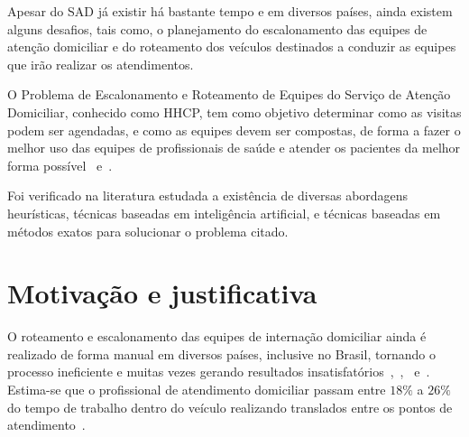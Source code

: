 Apesar do \ac{SAD} já existir há bastante tempo e em diversos países, ainda existem alguns desafios, tais como, o planejamento do escalonamento das equipes de atenção domiciliar e do roteamento dos veículos destinados a conduzir as equipes que irão realizar os atendimentos.

O Problema de Escalonamento e Roteamento de Equipes do Serviço de Atenção Domiciliar, conhecido como \ac{HHCP}, tem como objetivo determinar como as visitas podem ser agendadas, e como as equipes devem ser compostas, de forma a fazer o melhor uso das equipes de profissionais de saúde e atender os pacientes da melhor forma possível~\cite{Bertels:2006} e~\cite{Decerle:2016}.



Foi verificado na literatura estudada a existência de diversas abordagens heurísticas, técnicas baseadas em inteligência artificial, e técnicas baseadas em métodos exatos para solucionar o problema citado.

\section{Motivação e justificativa}

O roteamento e escalonamento das equipes de internação domiciliar ainda é realizado de forma manual em diversos países, inclusive no Brasil, tornando o processo ineficiente e muitas vezes gerando resultados insatisfatórios~\cite{cheng:98},~\cite{bachouch:2010},~\cite{tozlu:2016} e~\cite{cattafi:2012}.
Estima-se que o profissional de atendimento domiciliar passam entre $18\%$ a $26\%$ do tempo de trabalho dentro do veículo realizando translados entre os pontos de atendimento~\cite{holm:2014}.

